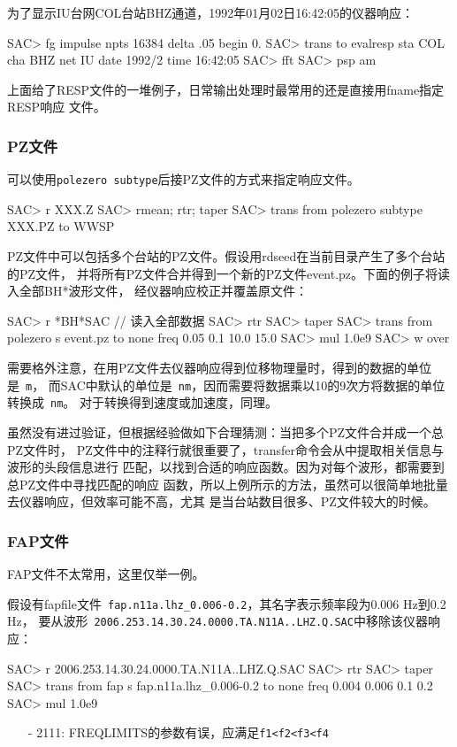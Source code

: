 为了显示IU台网COL台站BHZ通道，1992年01月02日16:42:05的仪器响应：
\begin{SACCode}
SAC> fg impulse npts 16384 delta .05 begin 0.
SAC> trans to evalresp sta COL cha BHZ net IU date 1992/2 time 16:42:05
SAC> fft
SAC> psp am
\end{SACCode}

上面给了RESP文件的一堆例子，日常输出处理时最常用的还是直接用fname指定RESP响应
文件。

\subsubsection{PZ文件}
可以使用\verb+polezero subtype+后接PZ文件的方式来指定响应文件。
\begin{SACCode}
SAC> r XXX.Z
SAC> rmean; rtr; taper
SAC> trans from polezero subtype XXX.PZ to WWSP
\end{SACCode}

PZ文件中可以包括多个台站的PZ文件。假设用rdseed在当前目录产生了多个台站的PZ文件，
并将所有PZ文件合并得到一个新的PZ文件event.pz。下面的例子将读入全部BH*波形文件，
经仪器响应校正并覆盖原文件：
\begin{SACCode}
SAC> r *BH*SAC          // 读入全部数据
SAC> rtr
SAC> taper
SAC> trans from polezero s event.pz to none freq 0.05 0.1 10.0 15.0
SAC> mul 1.0e9
SAC> w over
\end{SACCode}

需要格外注意，在用PZ文件去仪器响应得到位移物理量时，得到的数据的单位是~\verb+m+，
而SAC中默认的单位是~\verb+nm+，因而需要将数据乘以10的9次方将数据的单位转换成~\verb+nm+。
对于转换得到速度或加速度，同理。

虽然没有进过验证，但根据经验做如下合理猜测：当把多个PZ文件合并成一个总PZ文件时，
PZ文件中的注释行就很重要了，transfer命令会从中提取相关信息与波形的头段信息进行
匹配，以找到合适的响应函数。因为对每个波形，都需要到总PZ文件中寻找匹配的响应
函数，所以上例所示的方法，虽然可以很简单地批量去仪器响应，但效率可能不高，尤其
是当台站数目很多、PZ文件较大的时候。

\subsubsection{FAP文件}
FAP文件不太常用，这里仅举一例。

假设有fapfile文件~\verb+fap.n11a.lhz_0.006-0.2+，其名字表示频率段为0.006 Hz到0.2 Hz，
要从波形~\verb+2006.253.14.30.24.0000.TA.N11A..LHZ.Q.SAC+中移除该仪器响应：
\begin{SACCode}
SAC> r 2006.253.14.30.24.0000.TA.N11A..LHZ.Q.SAC
SAC> rtr
SAC> taper
SAC> trans from fap s fap.n11a.lhz_0.006-0.2 to none freq 0.004 0.006 0.1 0.2
SAC> mul 1.0e9
\end{SACCode}

\begin{itemize}
\item[-] 2111: FREQLIMITS的参数有误，应满足\verb+f1<f2<f3<f4+
\end{itemize}
